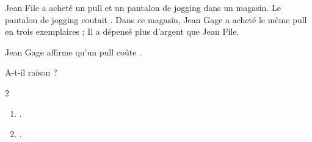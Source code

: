 \begin{exercice*}
    Jean File a acheté un pull et un pantalon de jogging dans un magasin.
    Le pantalon de jogging coutait . Dans ce magasin, Jean Gage a acheté le même 
    pull en trois exemplaires ; Il a dépensé plus d'argent que Jean File.

    Jean Gage affirme qu'un pull coûte .

    A-t-il raison ?
\end{exercice*}
\begin{corrige}
    \phantom{rrr}    
    \begin{multicols}2
        \begin{enumerate}
            \item .
            \item .
        \end{enumerate}
    \end{multicols}
\end{corrige}

